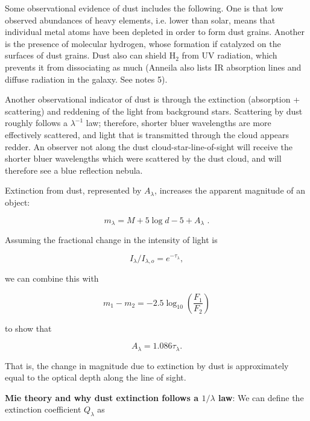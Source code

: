Some observational evidence of dust includes the following. One is that low observed abundances of heavy elements, i.e. lower than solar, means that individual metal atoms have been depleted in order to form dust grains. Another is the presence of molecular hydrogen, whose formation if catalyzed on the surfaces of dust grains. Dust also can shield H$_2$ from UV radiation, which prevents it from dissociating as much (Anneila also lists IR absorption lines and diffuse radiation in the galaxy. See notes 5).

Another observational indicator of dust is through the extinction (absorption + scattering) and reddening of the light from background stars.  Scattering by dust roughly follows a $\lambda^{-1}$ law; therefore, shorter bluer wavelengths are more effectively scattered, and light that is transmitted through the cloud appears redder.  An observer not along the dust cloud-star-line-of-sight will receive the shorter bluer wavelengths which were scattered by the dust cloud, and will therefore see a blue reflection nebula.

Extinction from dust, represented by $A_\lambda$, increases the apparent magnitude of an object:

\begin{equation}
m_\lambda = M + 5 \log d - 5 + A_\lambda \,\, .
\end{equation}

Assuming the fractional change in the intensity of light is

\begin{equation}
I_{\lambda} / I_{\lambda,o} = e^{-\tau_{\lambda}},
\end{equation}

\noindent we can combine this with

\begin{equation}
m_1 - m_2 = -2.5 \log_{10} \left(\frac{F_1}{F_2}\right)
\end{equation}

\noindent to show that

\begin{equation}
A_\lambda = 1.086 \tau_\lambda.
\end{equation}

That is, the change in magnitude due to extinction by dust is approximately equal to the optical depth along the line of sight.

\textbf{Mie theory and why dust extinction follows a $1/\lambda$ law}: We can define the extinction coefficient $Q_{\lambda}$ as

